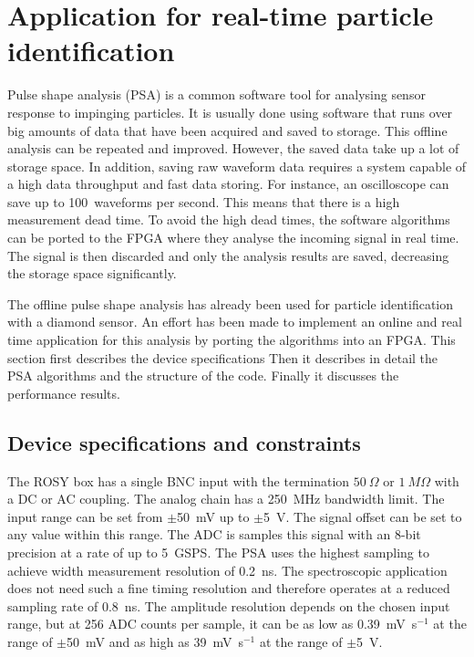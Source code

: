 \documentclass[12pt]{mytustyle}  %
\begin{document}
\section{Application for real-time particle identification}
\label{sec:rtpi}
Pulse shape analysis (PSA) is a common software tool for analysing sensor response to impinging particles. It is usually done using software that runs over big amounts of data that have been acquired and saved to storage. This offline analysis can be repeated and improved. However, the saved data take up a lot of storage space. In addition, saving raw waveform data requires a system capable of a high data throughput and fast data storing. For instance, an oscilloscope can save up to 100~waveforms per second. This means that there is a high measurement dead time. To avoid the high dead times, the software algorithms can be ported to the FPGA where they analyse the incoming signal in real time. The signal is then discarded and only the analysis results are saved, decreasing the storage space significantly.

The offline pulse shape analysis has already been used for particle identification with a diamond sensor. An effort has been made to implement an online and real time application for this analysis by porting the algorithms into an FPGA. This section first describes the device specifications Then it describes in detail the PSA algorithms and the structure of the code. Finally it discusses the performance results.



\subsection{Device specifications and constraints}
The ROSY box has a single BNC input with the termination $50~\Omega$ or $1~M\Omega$ with a DC or AC coupling. The analog chain has a 250~MHz bandwidth limit. The input range can be set from $\pm$50~mV up to $\pm$5~V. The signal offset can be set to any value within this range. The ADC is samples this signal with an 8-bit precision at a rate of up to 5~GSPS. The PSA uses the highest sampling to achieve width measurement resolution of 0.2~ns. The spectroscopic application does not need such a fine timing resolution and therefore operates at a reduced sampling rate of 0.8~ns. The amplitude resolution depends on the chosen input range, but at 256 ADC counts per sample, it can be as low as 0.39~mV~s$^{-1}$ at the range of $\pm$50~mV and as high as 39~mV~s$^{-1}$ at the range of $\pm$5~V.
\end{document}
